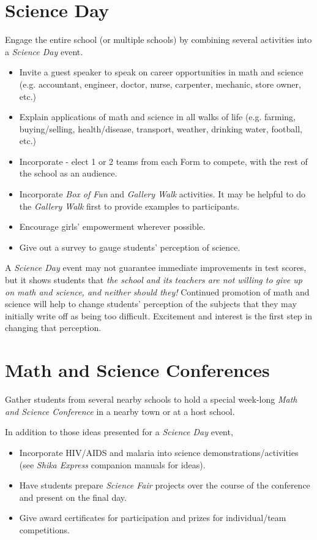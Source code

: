 \section{Science Day} 
Engage the entire school (or multiple schools) by combining several activities into a \emph{Science Day} event.

\begin{itemize}
\item Invite a guest speaker to speak on career opportunities in math and science (e.g. accountant, engineer, doctor, nurse, carpenter, mechanic, store owner, etc.)
\item Explain applications of math and science in all walks of life (e.g. farming, buying/selling, health/disease, transport, weather, drinking water, football, etc.)
\item Incorporate \emph{} - elect 1 or 2 teams from each Form to compete, with the rest of the school as an audience.
\item Incorporate \emph{Box of Fun} and \emph{Gallery Walk} activities. It may be helpful to do the \emph{Gallery Walk} first to provide examples to participants.
\item Encourage girls' empowerment wherever possible.
\item Give out a survey to gauge students' perception of science.
\end{itemize}

A \emph{Science Day} event may not guarantee immediate improvements in test scores, but it shows students that \emph{the school and its teachers are not willing to give up on math and science, and neither should they!} Continued promotion of math and science will help to change students' perception of the subjects that they may initially write off as being too difficult. Excitement and interest is the first step in changing that perception.

\section{Math and Science Conferences} 
Gather students from several nearby schools to hold a special week-long \emph{Math and Science Conference} in a nearby town or at a host school.

In addition to those ideas presented for a \emph{Science Day} event,
\begin{itemize}
\item Incorporate HIV/AIDS and malaria into science demonstrations/activities (see \emph{Shika Express} companion manuals for ideas).
\item Have students prepare \emph{Science Fair} projects over the course of the conference and present on the final day.
\item Give award certificates for participation and prizes for individual/team competitions.
\end{itemize}

